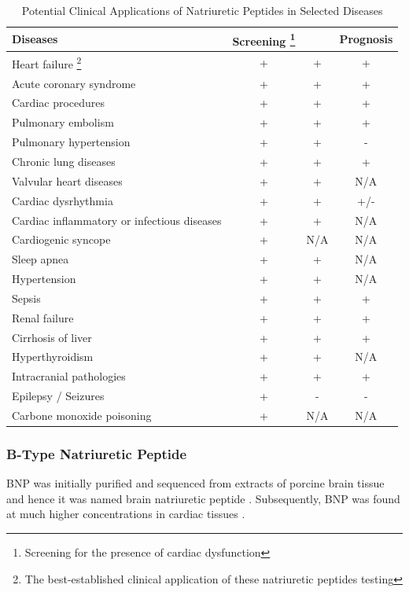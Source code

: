 \documentclass[14pt,a4paper,onecolumn]{extarticle}
\begin{document}
\begin{table}
    \caption{Potential Clinical Applications of Natriuretic Peptides in Selected Diseases}
    \begin{tabular}{|l|c|c|c|}
        \hline
        Diseases & Screening \footnote{Screening for the presence of cardiac dysfunction} &  & Prognosis \\
        \hline
        Heart failure \footnote{The best-established clinical application of these natriuretic peptides testing} & + & + & + \\
        Acute coronary syndrome & + & + & + \\
        Cardiac procedures & + & + & + \\
        Pulmonary embolism & + & + & + \\
        Pulmonary hypertension & + & + & - \\
        Chronic lung diseases & + & + & + \\
        Valvular heart diseases & + & + & N/A \\
        Cardiac dysrhythmia & + & + & +/- \\
        Cardiac inflammatory or infectious diseases & + & + & N/A \\
        Cardiogenic syncope & + & N/A & N/A \\
        Sleep apnea & + & + & N/A \\
        Hypertension & + & + & N/A \\
        Sepsis & + & + & + \\
        Renal failure & + & + & + \\
        Cirrhosis of liver & + & + & + \\
        Hyperthyroidism & + & + & N/A \\
        Intracranial pathologies & + & + & + \\
        Epilepsy / Seizures & + & - & - \\
        Carbone monoxide poisoning & + & N/A & N/A \\
        \hline
    \end{tabular}
    \label{NP_applications}
\end{table}


\subsubsection{B-Type Natriuretic Peptide}
BNP was initially purified and sequenced from extracts of porcine brain tissue and hence it was named brain natriuretic peptide \citep{Sudoh1988}. Subsequently, BNP was found at much higher concentrations in cardiac tissues \citep{Mukoyama1991} \citep{Mukoyama1990}.
\end{document}
